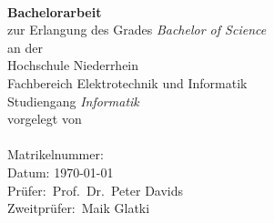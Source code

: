 
\begin{titlepage}

\begin{center}
{\Large\bf \@title}\\[3cm]



{\bf Bachelorarbeit}\\
zur Erlangung des Grades {\em Bachelor of Science}\\[1.5cm]

an der\\
Hochschule Niederrhein\\
Fachbereich Elektrotechnik und Informatik\\
Studiengang {\em Informatik}\\[3cm]

vorgelegt von\\
\@author\\
Matrikelnummer: \Matrikelnummer\\[3cm]
Datum: \today\\[3cm]

Prüfer:~Prof.~Dr.~Peter Davids
\\Zweitprüfer:~Maik Glatki

\end{center}
\end{titlepage}

\pagestyle{empty}
\clearpage

